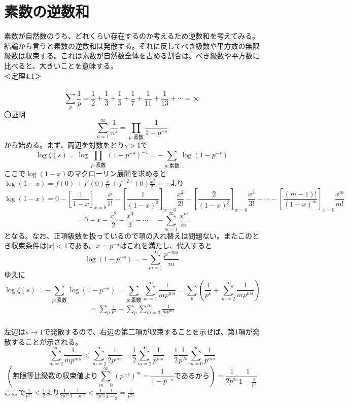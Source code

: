 \documentclass{jsarticle}
\begin{document}
\section{素数の逆数和}
素数が自然数のうち、どれくらい存在するのか考えるため逆数和を考えてみる。結論から言うと素数の逆数和は発散する。それに反してべき級数や平方数の無限級数は収束する。これは素数が自然数全体を占める割合は、べき級数や平方数に比べると、大きいことを意味する。\\
＜定理4.1＞\\
\
\begin{equation}
\sum_{p}\frac{1}{p}=\frac{1}{2}+\frac{1}{3}+\frac{1}{5}+\frac{1}{7}+\frac{1}{11}+\frac{1}{13}+\cdots=\infty
\end{equation}
〇証明
\[\sum_{n=1}^{\infty}\frac{1}{n^{s}}=\prod_{p:素数}\frac{1}{1-p^{-s}}\]
から始める。まず、両辺を対数をとり\(s>1\)で
\[\log\zeta\left(s\right)=\log\prod_{p:素数}\left(1-p^{-s}\right)^{-1}=-\sum_{p:素数}\log\left(1-p^{-s}\right)\]
ここで\(\log\left(1-x\right)\)のマクローリン展開を求めると
\(\displaystyle\log\left(1-x\right)=f(0)+f'(0)\frac{x}{1!}+f^{(2)}(0)\frac{x^{2}}{2!}+\cdots\)より
\[\log(1-x)=0-\left[\frac{1}{1-x}\right]_{x=0}\frac{x}{1!}-\left[\frac{1}{(1-x)^{2}}\right]_{x=0}\frac{x^{2}}{2!}-\left[\frac{2}{(1-x)^{3}}\right]_{x=0}\frac{x^{3}}{3!}-\cdots-\left[\frac{(m-1)!}{(1-x)^{m}}\right]_{x=0}\frac{x^{m}}{m!}\]
\[=0-x-\frac{x^{2}}{2}-\frac{x^{3}}{3}-\cdots=-\sum_{m=1}^{\infty}\frac{x^{m}}{m}\]
となる。なお、正項級数を扱っているので項の入れ替えは問題ない。またこのとき収束条件は\(|x|<1\)である。\(x=p^{-s}\)はこれを満たし、代入すると
\[\log(1-p^{-s})=-\sum_{m=1}^{\infty}\frac{p^{-ms}}{m}\]
ゆえに
\[\log\zeta(s)=-\sum_{p:素数}\log(1-p^{-s})=\sum_{p:素数}\sum_{m=1}^{\infty}\frac{1}{mp^{ms}}=\sum_{p}\left(\frac{1}{p^{s}}+\sum_{m=2}^{
\infty}\frac{1}{mp^{ms}}\right)\]
\begin{eqnarray}
=\sum_{p}\frac{1}{p^{s}}+\sum_{p}\sum_{m=2}^{\infty}\frac{1}{mp^{ms}}
\end{eqnarray}
\\
左辺は\(s\rightarrow1\)で発散するので、右辺の第二項が収束することを示せば、第1項が発散することが示される。
\[\sum_{m=2}^{\infty}\frac{1}{mp^{ms}}<\sum_{m=2}^{\infty}\frac{1}{2p^{ms}}=\frac{1}{2}\sum_{m=2}^{\infty}\frac{1}{p^{ms}}=\frac{1}{2}\frac{1}{p^{2s}}\sum_{m=0}^{\infty}\frac{1}{p^{ms}}\]
\[\left( 無限等比級数の収束値より\sum_{m=0}^{\infty}\left(p^{-s}\right)^{m}=\frac{1}{1-p^{-s}}であるから\right)=\frac{1}{2p^{2s}}\frac{1}{1-\frac{1}{p^{s}}}\]
ここで\(\frac{1}{p^{2s}}<\frac{1}{2}\)より\hspace{10mm}\(\displaystyle\frac{1}{2p^{2s}}\frac{1}{1-p^{-s}}<\frac{1}{2p^{2s}}\frac{1}{1-\frac{1}{2}}=\frac{1}{p^{2s}}\)\\
\end{document}
